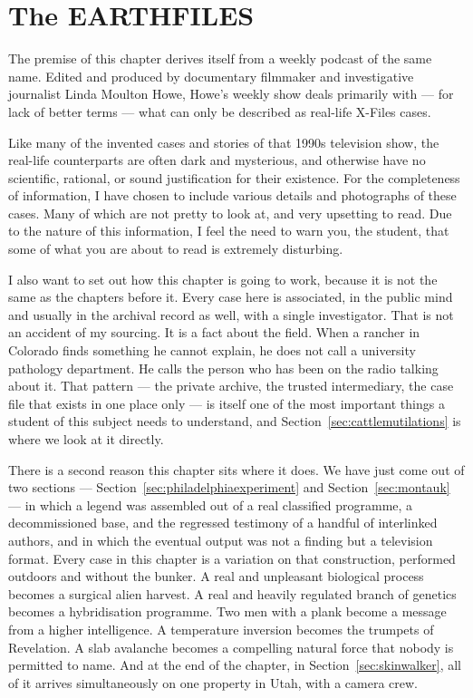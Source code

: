 \chapter{The EARTHFILES}\label{ch:earthfiles}


The premise of this chapter derives itself from a weekly podcast of the same name. Edited and
produced by documentary filmmaker and investigative journalist Linda Moulton Howe, Howe's weekly
show deals primarily with --- for lack of better terms --- what can only be described as real-life
X-Files cases.

Like many of the invented cases and stories of that 1990s television show, the real-life
counterparts are often dark and mysterious, and otherwise have no scientific, rational, or sound
justification for their existence. For the completeness of information, I have chosen to include
various details and photographs of these cases. Many of which are not pretty to look at, and very
upsetting to read. Due to the nature of this information, I feel the need to warn you, the
student, that some of what you are about to read is extremely disturbing.

I also want to set out how this chapter is going to work, because it is not the same as the
chapters before it. Every case here is associated, in the public mind and usually in the archival
record as well, with a single investigator. That is not an accident of my sourcing. It is a fact
about the field. When a rancher in Colorado finds something he cannot explain, he does not call a
university pathology department. He calls the person who has been on the radio talking about it.
That pattern --- the private archive, the trusted intermediary, the case file that exists in one
place only --- is itself one of the most important things a student of this subject needs to
understand, and Section~\ref{sec:cattlemutilations} is where we look at it directly.

There is a second reason this chapter sits where it does. We have just come out of two sections
--- Section~\ref{sec:philadelphiaexperiment} and Section~\ref{sec:montauk} --- in which a legend
was assembled out of a real classified programme, a decommissioned base, and the regressed
testimony of a handful of interlinked authors, and in which the eventual output was not a finding
but a television format. Every case in this chapter is a variation on that construction,
performed outdoors and without the bunker. A real and unpleasant biological process becomes a
surgical alien harvest. A real and heavily regulated branch of genetics becomes a hybridisation
programme. Two men with a plank become a message from a higher intelligence. A temperature
inversion becomes the trumpets of Revelation. A slab avalanche becomes a compelling natural
force that nobody is permitted to name. And at the end of the chapter, in
Section~\ref{sec:skinwalker}, all of it arrives simultaneously on one property in Utah, with a
camera crew.

